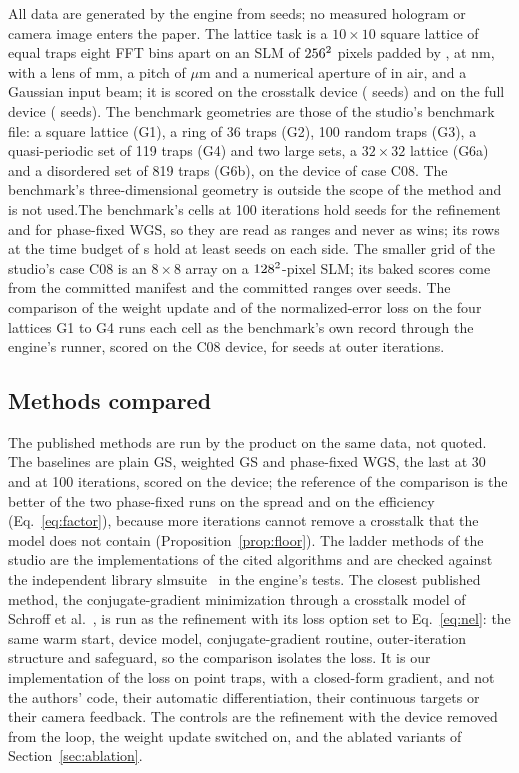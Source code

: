 All data are generated by the engine from seeds; no measured hologram or camera image enters the paper. The lattice task is a $10\times10$ square lattice of equal traps eight FFT bins apart on an SLM of $256^2$ pixels padded by \parPad, at \parLambda{} nm, with a lens of \parFocal{} mm, a pitch of \parPitch{} $\mu$m and a numerical aperture of
\parNa{} in air, and a Gaussian input beam; it is scored on the crosstalk device (\nSeedsOne{} seeds) and on the full device (\nSeedsOneFull{} seeds). The benchmark geometries are those of the studio's benchmark file: a square lattice (G1), a ring of 36 traps (G2), 100 random traps (G3), a quasi-periodic set of 119 traps (G4) and two large sets, a $32\times32$ lattice (G6a) and a disordered set of
819 traps (G6b), on the device of case C08. The benchmark's three-dimensional geometry is outside the scope of the method and is not used.The benchmark's cells at 100 iterations hold \benchOneDevSeeds{} seeds for the refinement and \benchOneDevSeedsMseven{} for phase-fixed WGS, so they are read as ranges and never as wins; its rows at the time budget of \benchOneTimeBudget{} s hold at least \benchOneWinMinSeeds{} seeds on each side. The smaller grid of the studio's case C08 is an $8\times8$ array on a $128^2$-pixel SLM; its baked scores come from
the committed manifest and the committed ranges over \bakeCeightSeedsN{} seeds. The comparison of the weight update and of the normalized-error loss on the four lattices G1 to G4 runs each cell as the benchmark's own record through the engine's runner, scored on the C08 device, for \geoSeeds{} seeds at \geoIters{} outer iterations.

\subsection{Methods compared}

The published methods are run by the product on the same data, not quoted. The baselines are plain GS, weighted GS and phase-fixed WGS, the last at 30 and at 100 iterations, scored on the device; the reference of the comparison is the better of the two phase-fixed runs on the spread and on the efficiency (Eq.~\ref{eq:factor}), because more iterations cannot remove a crosstalk that the model does not contain (Proposition~\ref{prop:floor}).
The ladder methods of the studio are the implementations of the cited algorithms and are checked against the independent library slmsuite~\cite{slmsuite} in the engine's tests. The closest published method, the conjugate-gradient minimization through a crosstalk model of Schroff et al.~\cite{schroff}, is run as the refinement with its loss option set to Eq.~\ref{eq:nel}: the same warm start, device model, conjugate-gradient routine, outer-iteration structure and safeguard, so the comparison isolates the loss. It is our implementation of the loss on point traps, with a closed-form gradient, and not the authors' code, their automatic differentiation, their continuous targets or their camera feedback. The controls are the refinement with the device removed from the loop, the weight update switched on, and the ablated variants of Section~\ref{sec:ablation}.


